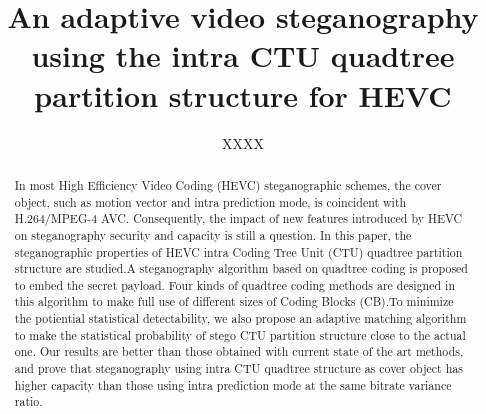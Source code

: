 \documentclass[journal,sort]{IEEEtran}
\begin{document}
\title{An adaptive video steganography using the intra CTU quadtree partition structure for HEVC}
\author{XXXX}
	

\maketitle

\begin{abstract}
In most High Efficiency Video Coding (HEVC) steganographic schemes, the cover object, such as motion vector and intra prediction mode, is coincident with H.264/MPEG-4 AVC. Consequently, the impact of new features introduced by HEVC on steganography security and capacity is still a question. In this paper, the steganographic properties of HEVC intra Coding Tree Unit (CTU) quadtree partition structure are studied.A steganography algorithm based on quadtree coding is proposed to embed the secret payload. Four kinds of quadtree coding methods are designed in this algorithm to make full use of different sizes of Coding Blocks (CB).To minimize the potiential statistical detectability, we also propose an adaptive matching algorithm to make the statistical probability of stego CTU partition structure close to the actual one. Our results are better
than those obtained with current state of the art methods, and prove that steganography using intra CTU quadtree structure as cover object has higher capacity than those using intra prediction mode at the same bitrate variance ratio.

	
	
\end{abstract}	
	
	
\end{document}
